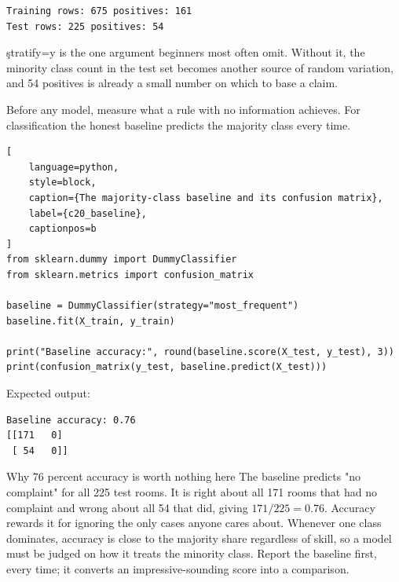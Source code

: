 \begin{lstlisting}[language=text, style=block, caption={Both parts keep the same complaint rate}, label={c20_split_output}, captionpos=b]
Training rows: 675 positives: 161
Test rows: 225 positives: 54
\end{lstlisting}

\c{stratify=y} is the one argument beginners most often omit. Without it, the
minority class count in the test set becomes another source of random variation,
and 54 positives is already a small number on which to base a claim.


Before any model, measure what a rule with no information achieves. For
classification the honest baseline predicts the majority class every time.

\begin{lstlisting}[
    language=python,
    style=block,
    caption={The majority-class baseline and its confusion matrix},
    label={c20_baseline},
    captionpos=b
]
from sklearn.dummy import DummyClassifier
from sklearn.metrics import confusion_matrix

baseline = DummyClassifier(strategy="most_frequent")
baseline.fit(X_train, y_train)

print("Baseline accuracy:", round(baseline.score(X_test, y_test), 3))
print(confusion_matrix(y_test, baseline.predict(X_test)))
\end{lstlisting}

Expected output:

\begin{lstlisting}[language=text, style=block, caption={High accuracy, zero usefulness}, label={c20_baseline_output}, captionpos=b]
Baseline accuracy: 0.76
[[171   0]
 [ 54   0]]
\end{lstlisting}

\begin{ExplainBox}{Why 76 percent accuracy is worth nothing here}
The baseline predicts "no complaint" for all 225 test rooms. It is right about
all 171 rooms that had no complaint and wrong about all 54 that did, giving
$171/225 = 0.76$. Accuracy rewards it for ignoring the only cases anyone cares
about. Whenever one class dominates, accuracy is close to the majority share
regardless of skill, so a model must be judged on how it treats the minority
class. Report the baseline first, every time; it converts an impressive-sounding
score into a comparison.
\end{ExplainBox}

